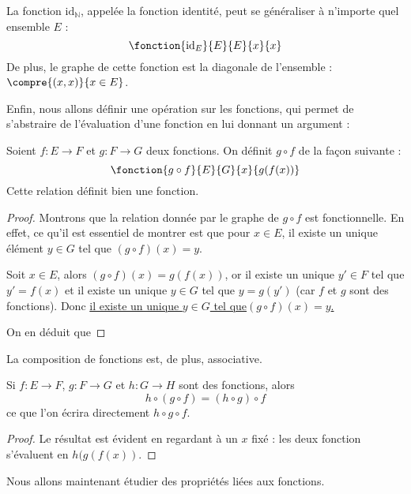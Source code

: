 \begin{rmk}
    La fonction $\mathrm{id}_\mathbb N$, appelée la fonction identité, peut se généraliser à n'importe quel ensemble $E$ :
    $$\fonction{\mathrm{id}_E}{E}{E}{x}{x}
    $$
    De plus, le graphe de cette fonction est la diagonale de l'ensemble : $\compre{(x,x)}{x\in E}$.
\end{rmk}

Enfin, nous allons définir une opération sur les fonctions, qui permet de s'abstraire de l'évaluation d'une fonction en lui donnant un argument :

\begin{defi}
    Soient $f : E \to F$ et $g : F \to G$ deux fonctions. On définit $g\circ f$ de la façon suivante :
    $$\fonction{g\circ f}{E}{G}{x}{g(f(x))}$$ Cette relation définit bien une fonction.
\end{defi}
\begin{proof}
    Montrons que la relation donnée par le graphe de $g\circ f$ est fonctionnelle. En effet, ce qu'il est essentiel de montrer est que pour $x\in E$, il existe un unique élément $y\in G$ tel que $(g\circ f)(x)=y$.
    
    Soit $x\in E$, alors $(g\circ f)(x)=g(f(x))$, or il existe un unique $y'\in F$ tel que $y'=f(x)$ et il existe un unique $y\in G$ tel que $y=g(y')$ (car $f$ et $g$ sont des fonctions). Donc \underline{il existe un unique $y\in G$ tel que}\quad\underline{$(g\circ f)(x)=y$.}
    
    On en déduit que 
\end{proof}

La composition de fonctions est, de plus, associative.

\begin{prop}
    Si $f : E \to F$, $g : F\to G$ et $h : G\to H$ sont des fonctions, alors $$h\circ(g\circ f)=(h\circ g)\circ f$$ ce que l'on écrira directement $h\circ g \circ f$.
\end{prop}
\begin{proof}
    Le résultat est évident en regardant à un $x$ fixé : les deux fonction s'évaluent en $h(g(f(x))$.
\end{proof}

Nous allons maintenant étudier des propriétés liées aux fonctions.

